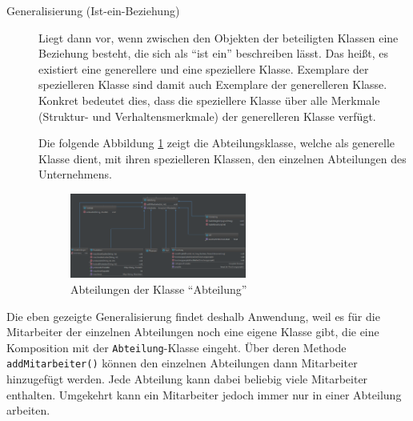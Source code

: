 \begin{description}
	\item[Generalisierung (Ist-ein-Beziehung)]
	Liegt dann vor, wenn zwischen den Objekten der beteiligten Klassen eine Beziehung besteht, die sich als \enquote{ist ein} beschreiben lässt. Das heißt, es existiert eine generellere und eine speziellere Klasse. Exemplare der spezielleren Klasse sind damit auch Exemplare der generelleren Klasse. Konkret bedeutet dies, dass die speziellere Klasse über alle Merkmale (Struktur- und Verhaltensmerkmale) der generelleren Klasse verfügt.

	Die folgende Abbildung \ref{abb:abteilungen} zeigt die Abteilungsklasse, welche als generelle Klasse dient, mit ihren spezielleren Klassen, den einzelnen Abteilungen des Unternehmens.
	\begin{figure}[h]
		\centering	\includegraphics[width=0.57\textwidth]{img/programmentwurf/abteilungen}
		\captionsetup{format=hang}
		\caption{
			\label{abb:abteilungen}Abteilungen der Klasse \enquote{Abteilung}}
	\end{figure}	
\end{description}

Die eben gezeigte Generalisierung findet deshalb Anwendung, weil es für die Mitarbeiter der einzelnen Abteilungen noch eine eigene Klasse gibt, die eine Komposition mit der \texttt{Abteilung}-Klasse eingeht. Über deren Methode \texttt{addMitarbeiter()} können den einzelnen Abteilungen dann Mitarbeiter hinzugefügt werden. Jede Abteilung kann dabei beliebig viele Mitarbeiter enthalten. Umgekehrt kann ein Mitarbeiter jedoch immer nur in einer Abteilung arbeiten.


